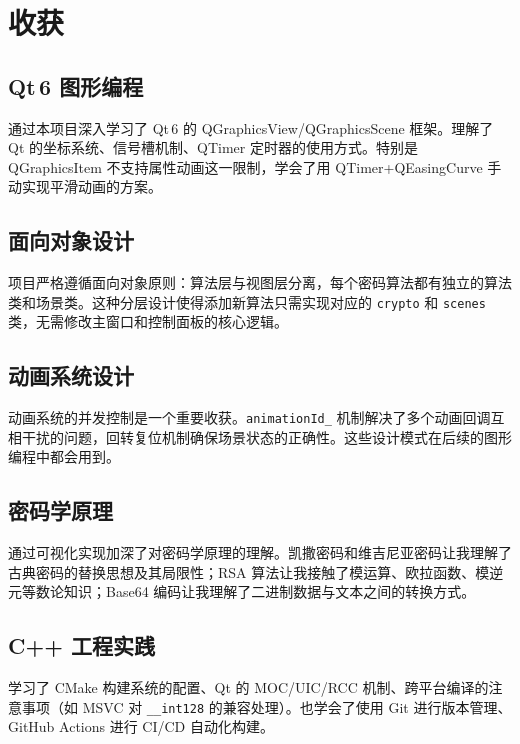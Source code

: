 \documentclass[a4paper,UTF8]{ctexart}
\begin{document}
\section{收获}

\subsection{Qt\,6 图形编程}

通过本项目深入学习了 Qt\,6 的 QGraphicsView/QGraphicsScene 框架。理解了 Qt 的坐标系统、信号槽机制、QTimer 定时器的使用方式。特别是 QGraphicsItem 不支持属性动画这一限制，学会了用 QTimer\;+\;QEasingCurve 手动实现平滑动画的方案。

\subsection{面向对象设计}

项目严格遵循面向对象原则：算法层与视图层分离，每个密码算法都有独立的算法类和场景类。这种分层设计使得添加新算法只需实现对应的 \texttt{crypto} 和 \texttt{scenes} 类，无需修改主窗口和控制面板的核心逻辑。

\subsection{动画系统设计}

动画系统的并发控制是一个重要收获。\texttt{animationId\_} 机制解决了多个动画回调互相干扰的问题，回转复位机制确保场景状态的正确性。这些设计模式在后续的图形编程中都会用到。

\subsection{密码学原理}

通过可视化实现加深了对密码学原理的理解。凯撒密码和维吉尼亚密码让我理解了古典密码的替换思想及其局限性；RSA 算法让我接触了模运算、欧拉函数、模逆元等数论知识；Base64 编码让我理解了二进制数据与文本之间的转换方式。

\subsection{C++ 工程实践}

学习了 CMake 构建系统的配置、Qt 的 MOC/UIC/RCC 机制、跨平台编译的注意事项（如 MSVC 对 \texttt{\_\_int128} 的兼容处理）。也学会了使用 Git 进行版本管理、GitHub Actions 进行 CI/CD 自动化构建。
\end{document}
